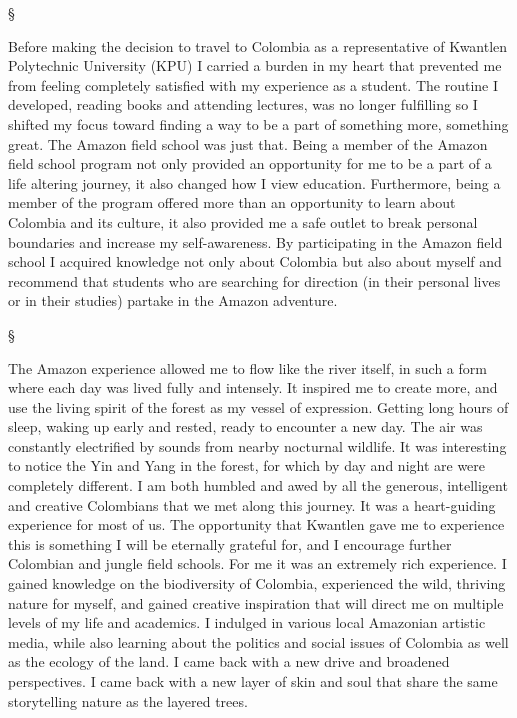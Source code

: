 \documentclass[letterpaper,10pt,headsepline]{scrreprt}
\begin{document}
\begin{center}§\end{center}

Before making the decision to travel to Colombia as a representative of
Kwantlen Polytechnic University (KPU) I carried a burden in my heart
that prevented me from feeling completely satisfied with my experience
as a student. The routine I developed, reading books and attending
lectures, was no longer fulfilling so I shifted my focus toward finding
a way to be a part of something more, something great. The Amazon field
school was just that. Being a member of the Amazon field school program
not only provided an opportunity for me to be a part of a life altering
journey, it also changed how I view education. Furthermore, being a
member of the program offered more than an opportunity to learn about
Colombia and its culture, it also provided me a safe outlet to break
personal boundaries and increase my self-awareness. By participating in
the Amazon field school I acquired knowledge not only about Colombia but
also about myself and recommend that students who are searching for
direction (in their personal lives or in their studies) partake in the
Amazon adventure.

\begin{center}§\end{center}

The Amazon experience allowed me to flow like the river itself, in such
a form where each day was lived fully and intensely. It inspired me to
create more, and use the living spirit of the forest as my vessel of
expression. Getting long hours of sleep, waking up early and rested,
ready to encounter a new day. The air was constantly electrified by
sounds from nearby nocturnal wildlife. It was interesting to notice the
Yin and Yang in the forest, for which by day and night are were
completely different. I am both humbled and awed by all the generous,
intelligent and creative Colombians that we met along this journey. It
was a heart-guiding experience for most of us. The opportunity that
Kwantlen gave me to experience this is something I will be eternally
grateful for, and I encourage further Colombian and jungle field
schools. For me it was an extremely rich experience. I gained knowledge
on the biodiversity of Colombia, experienced the wild, thriving nature
for myself, and gained creative inspiration that will direct me on
multiple levels of my life and academics. I indulged in various local
Amazonian artistic media, while also learning about the politics and
social issues of Colombia as well as the ecology of the land. I came
back with a new drive and broadened perspectives. I came back with a new
layer of skin and soul that share the same storytelling nature as the
layered trees.
\end{document}
